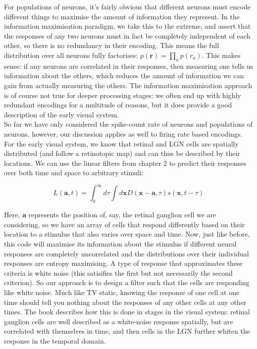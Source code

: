 \documentclass{article}
\begin{document}
For populations of neurons, it's fairly obvious that different neurons must encode different things to maximise the amount of information they represent. In the information maximisation paradigm, we take this to the extreme, and assert that the responses of any two neurons must in fact be completely independent of each other, so there is no redundancy in their encoding. This means the full distribution over all neurons fully factorises: $p(\bm{r})=\prod_ap(r_a)$. This makes sense: if any neurons are correlated in their responses, then measuring one tells us information about the others, which reduces the amount of information we can gain from actually measuring the others. The information maximisation approach is of course not true for deeper processing stages: we often end up with highly redundant encodings for a multitude of reasons, but it does provide a good description of the early visual system.\\

So far we have only considered the spike-count rate of neurons and populations of neurons, however, our discussion applies as well to firing rate based encodings. For the early visual system, we know that retinal and LGN cells are spatially distributed (and follow a retinotopic map) and can thus be described by their locations. We can use the linear filters from chapter 2 to predict their responses over both time and space to arbitrary stimuli:

\begin{equation*}
	L(\bm{a},t) = \int_0^{\infty} d\tau \int d\bm{x} D(\bm{x}-\bm{a},\tau) s(\bm{x},t-\tau)
\end{equation*}

Here, $\bm{a}$ represents the position of, say, the retinal ganglion cell we are considering, so we have an array of cells that respond differently based on their location to a stimulus that also varies over space and time. Now, just like before, this code will maximise its information about the stimulus if different neural responses are completely uncorrelated and the distributions over their individual responses are entropy maximising. A type of response that approximates these criteria is white noise (this satisifies the first but not necessarily the second criterion). So our approach is to design a filter such that the cells are responding like white noise. Much like TV static, knowing the response of one cell at one time should tell you nothing about the responses of any other cells at any other times. The book describes how this is done in stages in the visual system: retinal ganglion cells are well described as a white-noise response spatially, but are correlated with themselves in time, and then cells in the LGN further whiten the response in the temporal domain.\\
\end{document}
